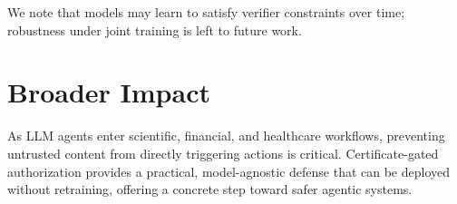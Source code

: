 \documentclass[9pt]{article}
\begin{document}
We note that models may learn to satisfy verifier constraints over time; robustness under joint training is left to future work.

\section{Broader Impact}

As LLM agents enter scientific, financial, and healthcare workflows, preventing untrusted content from directly triggering actions is critical.
Certificate-gated authorization provides a practical, model-agnostic defense that can be deployed without retraining, offering a concrete step toward safer agentic systems.
\end{document}
